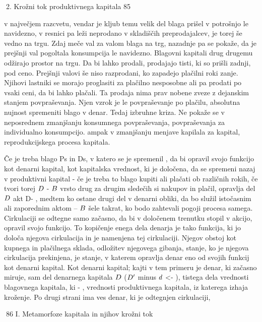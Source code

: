\documentclass[kapital_02.tex]{subfiles}
\begin{document}
2. Krožni tok produktivnega kapitala 85



 v največjem razcvetu, vendar je kljub temu velik del blaga prišel v potrošnjo le navidezno, v resnici pa leži neprodano v skladiščih preprodajalcev, je torej še vedno na trgu. Zdaj meče val za valom blaga na trg, nazadnje pa se pokaže, da je prejšnji val pogoltala konsumpcija le navidezno. Blagovni kapitali drug drugemu odžirajo prostor na trgu. Da bi lahko prodali, prodajajo tisti, ki so prišli zadnji, pod ceno. Prejšnji valovi še niso razprodani, ko zapadejo plačilni roki zanje. Njihovi lastniki se morajo proglasiti za plačilno nesposobne ali pa prodati po vsaki ceni, da bi lahko plačali. Ta prodaja nima prav nobene zveze z dejanskim stanjem povpraševanja. Njen vzrok je le povpraševanje po plačilu, absolutna nujnost spremeniti blago v denar. Tedaj izbruhne kriza. Ne pokaže se v neposrednem zmanjšanju konsumnega povpraševanja, povpraševanja za individualno konsumpcijo. ampak v zmanjšanju menjave kapilala za kapital, reprodukcijskega procesa kapitala.

Če je treba blago Ps in Ds, v katero se je spremenil \KPED, da bi opravil svojo funkcijo kot denarni kapital, kot kapitalska vrednost, ki je določena, da se spremeni nazaj v produktivni kapital - če je treba to blago kupiti ali plačati ob različnih rokih, če tvori torej \( D \) - \( B \) vrsto drug za drugim sledečih si nakupov in plačil, opravlja del \( D \) akt D- \KPEB, medtem ko ostane drugi del v denarni obliki, da bo služil istočasnim ali zaporednim aktom \KPED-- \( B \) šele takrat, ko bodo zahtevali pogoji procesa samega. Cirkulaciji se odtegne samo začasno, da bi v določenem trenutku stopil v akcijo, opravil svojo funkcijo. To kopičenje enega dela denarja je tako funkcija, ki jo določa njegova cirkulacija in je namenjena tej cirkulaciji. Njegov obstoj kot kupnega in plačilnega sklada, odložitev njegovega gibanja, stanje, ko je njegova cirkulacija prekinjena, je stanje, v katerem opravlja denar eno od svojih funkcij kot denarni kapital. Kot denarni kapital; kajti v tem primeru je denar, ki začasno miruje, sam del denarnega kapitala \( D \) (\( D' \) minus \( d \) <- \KPED), tistega dela vrednosti blagovnega kapitala, ki - \KPEP, vrednosti produktivnega kapitala, iz katerega izhaja kroženje. Po drugi strani ima ves denar, ki je odtegnjen cirkulaciji,



86 I. Metamorfoze kapitala in njihov krožni tok
\end{document}
